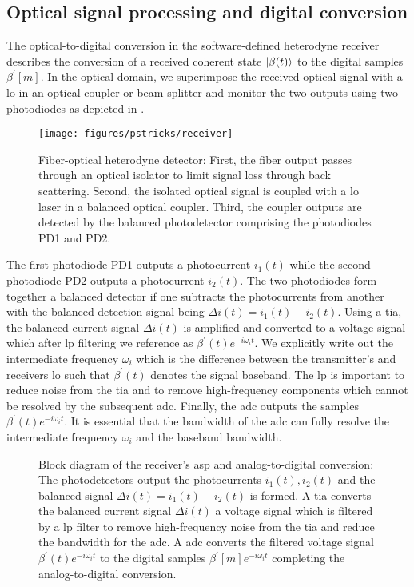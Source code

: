\subsection{Optical signal processing and digital conversion}

The optical-to-digital conversion in the software-defined heterodyne receiver describes the conversion of a received coherent state $\ket{\beta(t)}$ to the digital samples $\beta^\prime[m]$.
In the optical domain, we superimpose the received optical signal with a \gls{lo} in an optical coupler or beam splitter and monitor the two outputs using two photodiodes as depicted in .
\begin{figure}[htb]
	\centering
	\texttt{[image: figures/pstricks/receiver]}
	\caption{Fiber-optical heterodyne detector: First, the fiber output passes through an optical isolator to limit signal loss through back scattering. Second, the isolated optical signal is coupled with a \gls{lo} laser in a balanced optical coupler. Third, the coupler outputs are detected by  the balanced photodetector comprising the photodiodes PD1 and PD2.}\label{fig:fiber_optical_heterodyne_detector}
\end{figure}
The first photodiode PD1 outputs a photocurrent $i_1(t)$ while the second photodiode PD2 outputs a photocurrent $i_2(t)$.
The two photodiodes form together a balanced detector if one subtracts the photocurrents from another with the balanced detection signal being $\Delta i(t)=i_1(t)-i_2(t)$.
Using a \gls{tia}, the balanced current signal $\Delta i(t)$ is amplified and converted to a voltage signal which after \gls{lp} filtering we reference as $\beta^\prime(t)e^{-i\omega_i t}$.
We explicitly write out the intermediate frequency $\omega_i$ which is the difference between the transmitter's and receivers \gls{lo} such that $\beta^\prime(t)$ denotes the signal baseband.
The \gls{lp} is important to reduce noise from the \gls{tia} and to remove high-frequency components which cannot be resolved by the subsequent \gls{adc}.
Finally, the \gls{adc} outputs the samples $\beta^\prime(t)e^{-i\omega_it}$.
It is essential that the bandwidth of the \gls{adc} can fully resolve the intermediate frequency $\omega_i$ and the baseband bandwidth.
\begin{figure}[htb]
	\centering
	
	\caption{Block diagram of the receiver's \gls{asp} and analog-to-digital conversion: The photodetectors output the photocurrents $i_1(t),i_2(t)$ and the balanced signal $\Delta i(t)=i_1(t)-i_2(t)$ is formed. A \gls{tia} converts the balanced current signal $\Delta i(t)$ a voltage signal which is filtered by a \gls{lp} filter to remove high-frequency noise from the \gls{tia} and reduce the bandwidth for the \gls{adc}. A \gls{adc} converts the filtered voltage signal $\beta^\prime(t)e^{-i\omega_it}$ to the digital samples $\beta^\prime[m]e^{-i\omega_it}$ completing the analog-to-digital conversion.}
\end{figure}
